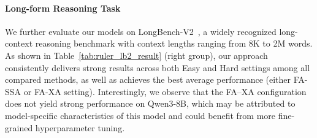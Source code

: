 \paragraph{Long-form Reasoning Task}
We further evaluate our models on LongBench-V2~\citep{bai2024longbench2}, a widely recognized long-context reasoning benchmark with context lengths ranging from 8K to 2M words. 
As shown in Table~\ref{tab:ruler_lb2_result} (right group), our approach consistently delivers strong results across both Easy and Hard settings among all compared methods, as well as achieves the best average performance (either FA-SSA or FA-XA setting).
Interestingly, we observe that the FA–XA configuration does not yield strong performance on Qwen3-8B, which may be attributed to model-specific characteristics of this model and could benefit from more fine-grained hyperparameter tuning.



